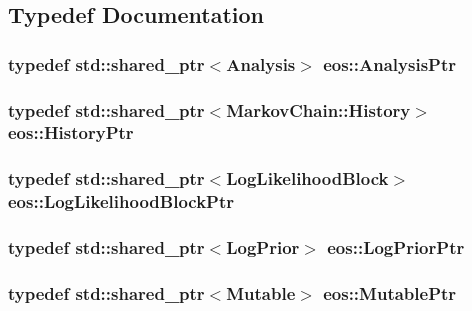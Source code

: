 \subsection{Typedef Documentation}
\hypertarget{namespaceeos_afc57020492535ccdd85cfc3b7421340d}{
\subsubsection[{AnalysisPtr}]{\setlength{\rightskip}{0pt plus 5cm}typedef std::shared\_\-ptr$<${\bf Analysis}$>$ {\bf eos::AnalysisPtr}}}
\label{namespaceeos_afc57020492535ccdd85cfc3b7421340d}
\hypertarget{namespaceeos_ac9f30fde04446cfabdd69d4b5b5d3c5a}{
\subsubsection[{HistoryPtr}]{\setlength{\rightskip}{0pt plus 5cm}typedef std::shared\_\-ptr$<${\bf MarkovChain::History}$>$ {\bf eos::HistoryPtr}}}
\label{namespaceeos_ac9f30fde04446cfabdd69d4b5b5d3c5a}
\hypertarget{namespaceeos_ab823a6782e060c440e05a614158ad1bf}{
\subsubsection[{LogLikelihoodBlockPtr}]{\setlength{\rightskip}{0pt plus 5cm}typedef std::shared\_\-ptr$<${\bf LogLikelihoodBlock}$>$ {\bf eos::LogLikelihoodBlockPtr}}}
\label{namespaceeos_ab823a6782e060c440e05a614158ad1bf}
\hypertarget{namespaceeos_ac5481e3b46ee55ff24606ee7f6e78651}{
\subsubsection[{LogPriorPtr}]{\setlength{\rightskip}{0pt plus 5cm}typedef std::shared\_\-ptr$<${\bf LogPrior}$>$ {\bf eos::LogPriorPtr}}}
\label{namespaceeos_ac5481e3b46ee55ff24606ee7f6e78651}
\hypertarget{namespaceeos_a0ab446e6a801d96a1ee83bb7c070686f}{
\subsubsection[{MutablePtr}]{\setlength{\rightskip}{0pt plus 5cm}typedef std::shared\_\-ptr$<${\bf Mutable}$>$ {\bf eos::MutablePtr}}}
